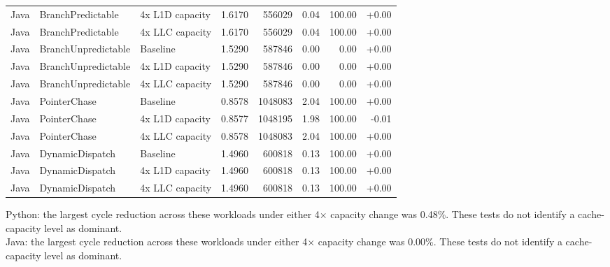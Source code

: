 {\begin{tabular}{lllrrrrr}
Java & BranchPredictable & 4x L1D capacity & 1.6170 & 556029 & 0.04 & 100.00 & +0.00 \\
Java & BranchPredictable & 4x LLC capacity & 1.6170 & 556029 & 0.04 & 100.00 & +0.00 \\
Java & BranchUnpredictable & Baseline & 1.5290 & 587846 & 0.00 & 0.00 & +0.00 \\
Java & BranchUnpredictable & 4x L1D capacity & 1.5290 & 587846 & 0.00 & 0.00 & +0.00 \\
Java & BranchUnpredictable & 4x LLC capacity & 1.5290 & 587846 & 0.00 & 0.00 & +0.00 \\
Java & PointerChase & Baseline & 0.8578 & 1048083 & 2.04 & 100.00 & +0.00 \\
Java & PointerChase & 4x L1D capacity & 0.8577 & 1048195 & 1.98 & 100.00 & -0.01 \\
Java & PointerChase & 4x LLC capacity & 0.8578 & 1048083 & 2.04 & 100.00 & +0.00 \\
Java & DynamicDispatch & Baseline & 1.4960 & 600818 & 0.13 & 100.00 & +0.00 \\
Java & DynamicDispatch & 4x L1D capacity & 1.4960 & 600818 & 0.13 & 100.00 & +0.00 \\
Java & DynamicDispatch & 4x LLC capacity & 1.4960 & 600818 & 0.13 & 100.00 & +0.00 \\
\bottomrule
\end{tabular}%
}
\par\medskip
\noindent Python: the largest cycle reduction across these workloads under either 4$\times$ capacity change was 0.48\%. These tests do not identify a cache-capacity level as dominant.\\
\noindent Java: the largest cycle reduction across these workloads under either 4$\times$ capacity change was 0.00\%. These tests do not identify a cache-capacity level as dominant.\\

